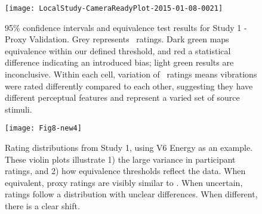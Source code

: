 \begin{figure*}[tb]
	\centering
	\texttt{[image: LocalStudy-CameraReadyPlot-2015-01-08-0021]}
	\caption{95\% confidence intervals and equivalence test results for Study 1 - Proxy Validation. Grey represents  \hifi~ratings. Dark green maps equivalence within our defined threshold, and red a statistical difference indicating an introduced bias; light green results are inconclusive. Within each cell, variation of \hifi~ratings means vibrations were rated differently compared to each other, suggesting they have different perceptual features and represent a varied set of source stimuli.
	}
	
	\label{fig:results:study1}
\end{figure*}

\begin{figure}[tb]
	\texttt{[image: Fig8-new4]}
	\caption{Rating distributions from Study 1, using V6 Energy as an example. These violin plots illustrate 1) the large variance in participant ratings, and 2) how equivalence thresholds reflect the data. When equivalent, proxy ratings are visibly similar to \hifi. When uncertain, ratings follow a distribution with unclear differences. When different, there is a clear shift.}
	\label{fig:violinplot}
\end{figure}

